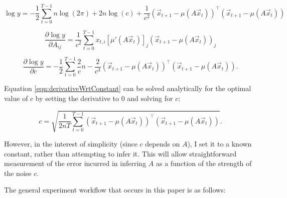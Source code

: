 \documentclass[12pt]{article}
\theoremstyle{definition}
\begin{document}
\begin{equation}
    \label{eqn:simpleLikelihood}
    \log y = -\frac{1}{2} \sum_{t=0}^{T-1} n \log(2\pi) + 2n \log(c) + \frac{1}{c^2}(\Vec{x}_{t+1} - \mu(A\Vec{x}_t))^\top (\Vec{x}_{t+1} - \mu(A\Vec{x}_t))
\end{equation}

\begin{equation}
    \label{eqn:simpleGradAElement}
    \frac{\partial \log y}{\partial A_{ij}} = \frac{1}{c^2} \sum_{t=0}^{T-1} x_{t,i} [\mu'(A\Vec{x}_t)]_j (\Vec{x}_{t+1} - \mu(A\Vec{x}_t))_j
\end{equation}

\begin{equation}
    \label{eqn:derivativeWrtConstant}
    \frac{\partial \log y}{\partial c} = - \frac{1}{2} \sum_{t=0}^{T-1} \frac{2}{c} n - \frac{2}{c^3} (\Vec{x}_{t+1} - \mu(A\Vec{x}_t))^\top (\Vec{x}_{t+1} - \mu(A\Vec{x}_t)).
\end{equation}

Equation \ref{eqn:derivativeWrtConstant} can be solved analytically for the optimal value of $c$ by setting the derivative to $0$ and solving for $c$:

\begin{equation}
    c = \sqrt{\frac{1}{2nT} \sum_{t=0}^{T-1} (\Vec{x}_{t+1} - \mu(A\Vec{x}_t))^\top (\Vec{x}_{t+1} - \mu(A\Vec{x}_t))}.
\end{equation}

However, in the interest of simplicity (since $c$ depends on $A$), I set it to a known constant, rather than attempting to infer it. This will allow straightforward measurement of the error incurred in inferring $A$ as a function of the strength of the noise $c$.

The general experiment workflow that occurs in this paper is as follows:
\end{document}
